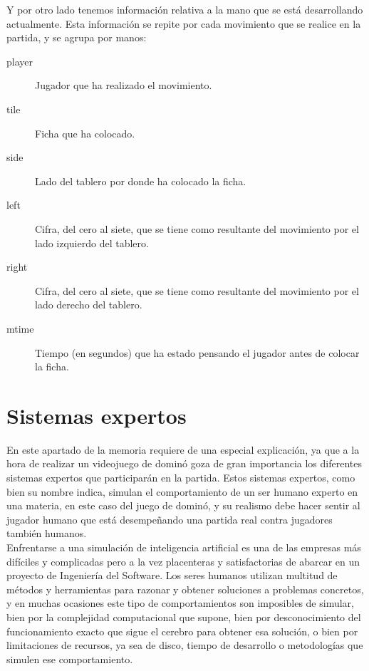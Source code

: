 Y por otro lado tenemos información relativa a la mano que se está desarrollando actualmente. Esta información se repite
por cada movimiento que se realice en la partida, y se agrupa por manos:

\begin{description}
    \item[player] Jugador que ha realizado el movimiento.
    \item[tile] Ficha que ha colocado.
    \item[side] Lado del tablero por donde ha colocado la ficha.
    \item[left] Cifra, del cero al siete, que se tiene como resultante del movimiento por el lado izquierdo del tablero.
    \item[right] Cifra, del cero al siete, que se tiene como resultante del movimiento por el lado derecho del tablero.
    \item[mtime] Tiempo (en segundos) que ha estado pensando el jugador antes de colocar la ficha.
\end{description}


\section{Sistemas expertos}

En este apartado de la memoria requiere de una especial explicación, ya que a la hora de realizar un videojuego de
dominó goza de gran importancia los diferentes sistemas expertos que participarán en la partida. Estos sistemas expertos,
como bien su nombre indica, simulan el comportamiento de un ser humano experto en una materia, en este caso del juego
de dominó, y su realismo debe hacer sentir al jugador humano que está desempeñando una partida real contra jugadores
también humanos. \\

Enfrentarse a una simulación de inteligencia artificial es una de las empresas más difíciles y complicadas pero a la
vez placenteras y satisfactorias de abarcar en un proyecto de Ingeniería del Software. Los seres humanos utilizan
multitud de métodos y herramientas para razonar y obtener soluciones a problemas concretos, y en muchas ocasiones
este tipo de comportamientos son imposibles de simular, bien por la complejidad computacional que supone, bien por
desconocimiento del funcionamiento exacto que sigue el cerebro para obtener esa solución, o bien por limitaciones de
recursos, ya sea de disco, tiempo de desarrollo o metodologías que simulen ese comportamiento. \\


